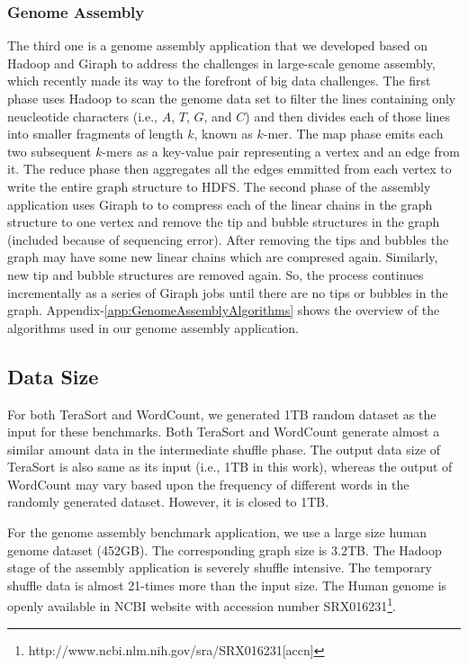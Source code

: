 \documentclass[journal]{IEEEtran}
\begin{document}
\subsubsection{Genome Assembly}
The third one is a genome assembly application that we developed based on Hadoop and Giraph to address the challenges in large-scale genome assembly, which recently made its way to the forefront of big data challenges. The first phase uses Hadoop to scan the genome data set to filter the lines containing only neucleotide characters (i.e., $A$, $T$, $G$, and $C$) and then divides each of those lines into smaller fragments of length $k$, known as $k$-mer. The map phase emits each two subsequent $k$-mers as a key-value pair representing a vertex and an edge from it. The reduce phase then aggregates all the edges emmitted from each vertex to write the entire graph structure to HDFS. The second phase of the assembly application uses Giraph to to compress each of the linear chains in the graph structure to one vertex and remove the tip and bubble structures in the graph (included because of sequencing error). After removing the tips and bubbles the graph may have some new linear chains which are compresed again. Similarly, new tip and bubble structures are removed again. So, the process continues incrementally as a series of Giraph jobs until there are no tips or bubbles in the graph. Appendix-\ref{app:GenomeAssemblyAlgorithms} shows the overview of the algorithms used in our genome assembly application.

\subsection{Data Size}
For both TeraSort and WordCount, we generated 1TB random dataset as the input for these benchmarks. Both TeraSort and WordCount generate almost a similar amount data in the intermediate shuffle phase. The output data size of TeraSort is also same as its input (i.e., 1TB in this work), whereas the output of WordCount may vary based upon the frequency of different words in the randomly generated dataset. However, it is closed to 1TB.

For the genome assembly benchmark application, we use a large size human genome dataset (452GB). The corresponding graph size is 3.2TB. The Hadoop stage of the assembly application is severely shuffle intensive. The temporary shuffle data is almost 21-times more than the input size. The Human genome is openly available in NCBI website with accession number SRX016231\footnote{http://www.ncbi.nlm.nih.gov/sra/SRX016231[accn]}.
\end{document}
